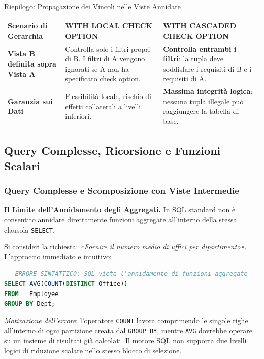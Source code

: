 \documentclass[12pt]{extarticle}
\begin{document}
\begin{cbox}{Riepilogo: Propagazione dei Vincoli nelle Viste Annidate}
\begin{center}
\small
\begin{tabular}{p{3.8cm}p{4.2cm}p{4.2cm}}
    \toprule
    \textbf{Scenario di Gerarchia} & \textbf{WITH LOCAL CHECK OPTION} & \textbf{WITH CASCADED CHECK OPTION} \\
    \midrule
    \textbf{Vista B definita sopra Vista A} & Controlla solo i filtri propri di B. I filtri di A vengono ignorati se A non ha specificato check option. & \textbf{Controlla entrambi i filtri}: la tupla deve soddisfare i requisiti di B e i requisiti di A. \\
    \addlinespace
    \textbf{Garanzia sui Dati} & Flessibilità locale, rischio di effetti collaterali a livelli inferiori. & \textbf{Massima integrità logica}: nessuna tupla illegale può raggiungere la tabella di base. \\
    \bottomrule
\end{tabular}
\end{center}
\end{cbox}

\subsection{Query Complesse, Ricorsione e Funzioni Scalari}

\subsubsection{Query Complesse e Scomposizione con Viste Intermedie}
\noindent \textbf{Il Limite dell'Annidamento degli Aggregati.} In SQL standard non è consentito annidare direttamente funzioni aggregate all'interno della stessa clausola \texttt{SELECT}. 

\medskip
\noindent Si consideri la richiesta: \textit{«Fornire il numero medio di uffici per dipartimento»}. L'approccio immediato e intuitivo:
\begin{lstlisting}[language=SQL, caption={Query sintatticamente errata: annidamento di aggregati}]
-- ERRORE SINTATTICO: SQL vieta l'annidamento di funzioni aggregate
SELECT AVG(COUNT(DISTINCT Office))
FROM   Employee
GROUP BY Dept;
\end{lstlisting}
\textit{Motivazione dell'errore}: l'operatore \texttt{COUNT} lavora comprimendo le singole righe all'interno di ogni partizione creata dal \texttt{GROUP BY}, mentre \texttt{AVG} dovrebbe operare su un insieme di risultati già calcolati. Il motore SQL non supporta due livelli logici di riduzione scalare nello stesso blocco di selezione.
\end{document}
